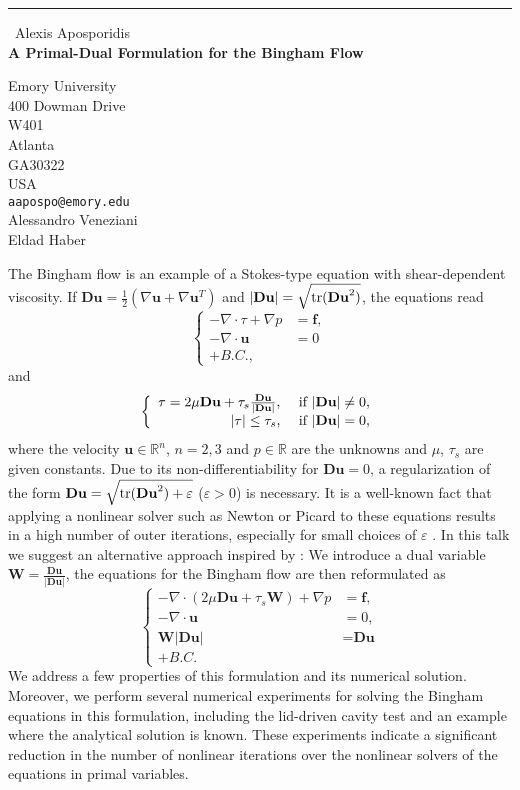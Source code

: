 \documentclass{report}
\begin{document}
\begin{center}
\rule{6in}{1pt} \
{\large Alexis Aposporidis \\
{\bf A Primal-Dual Formulation for the Bingham Flow}}

Emory University \\ 400 Dowman Drive \\ W401 \\ Atlanta \\ GA30322 \\ USA
\\
{\tt aapospo@emory.edu}\\
Alessandro Veneziani\\
Eldad Haber\end{center}

\newcommand{\Du}{\textbf{Du}}
\newcommand{\bu}{\textbf{u}}
\newcommand{\f}{\textbf{f}}
\newcommand{\tr}{\textnormal{tr}}
\newcommand{\bW}{\textbf{W}}

The Bingham flow is an example of a Stokes-type equation with
shear-dependent viscosity. If $\Du=\frac{1}{2}(\nabla \bu + \nabla
\bu^T)$ and $|\Du|=\sqrt{\tr(\Du^2)}$, the equations read
\[ \left\{ \begin{array}{rl} -\nabla \cdot \tau +\nabla p &= \f, \\
-\nabla \cdot \bu &=0 \\ +B.C., \end{array} \right. \]
and
\[ \left\{ \begin{array}{rl} \tau=2\mu \Du+\tau_s \frac{\Du}{|\Du|},
&\textnormal{ if } |\Du| \not=0, \\ |\tau| \leq \tau_s, & \textnormal{ if
} |\Du|=0, \end{array} \right. \]
where the velocity $\bu \in \mathbb{R}^n$, $n=2,3$ and $p \in \mathbb{R}$
are the unknowns and $\mu$, $\tau_s$ are given constants. Due to its
non-differentiability for $\Du =0$, a regularization of the form $\Du =
\sqrt{\tr(\Du^2)+\varepsilon}$ ($\varepsilon >0$) is necessary. It is a
well-known fact that applying a nonlinear solver such as Newton or Picard
to these equations results in a high number of outer iterations,
especially for small choices of $\varepsilon$ \cite{1}. In this talk we
suggest an alternative approach inspired by \cite{6}: We introduce a dual
variable $\bW = \frac{\Du}{|\Du|}$, the equations for the Bingham flow
are then reformulated as
\[ \left\{ \begin{array}{rl} -\nabla \cdot \left( 2\mu \Du + \tau_s \bW
\right) +\nabla p &=\f, \\ -\nabla \cdot \bu &=0, \\ \bW |\Du| &=\Du \\
+B.C. \end{array} \right. \]
We address a few properties of this formulation and its numerical
solution. Moreover, we perform several numerical experiments for solving
the Bingham equations in this formulation, including the lid-driven
cavity test and an example where the analytical solution is known. These
experiments indicate a significant reduction in the number of nonlinear
iterations over the nonlinear solvers of the equations in primal
variables. \\[2mm]
\end{document}
